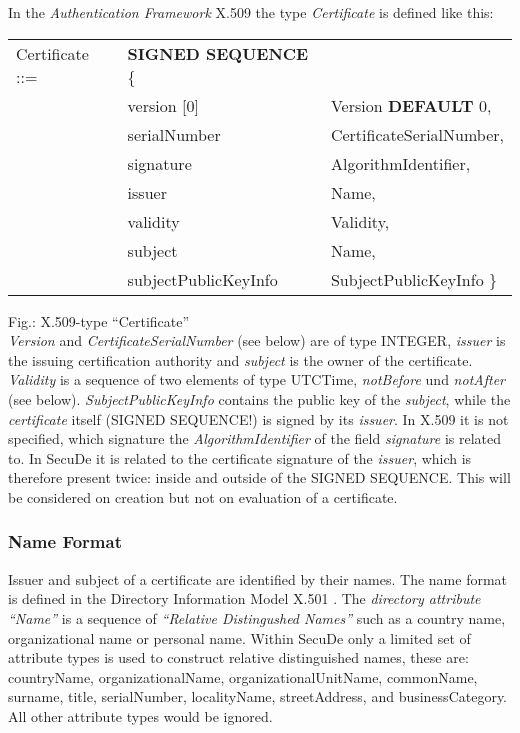 In the {\em Authentication Framework} X.509 \cite{cci4} the type
{\em Certificate} is defined like this:

\begin {center}
\begin {tabular}{lll}
Certificate ::= & {\bf SIGNED SEQUENCE} \{ & \\
  & version [0]   & Version {\bf DEFAULT} 0, \\
  & serialNumber  & CertificateSerialNumber, \\
  & signature     & AlgorithmIdentifier,     \\
  & issuer        & Name,                    \\
  & validity      & Validity,                \\
  & subject       & Name,                    \\
  & subjectPublicKeyInfo & SubjectPublicKeyInfo \} \\
\end {tabular}
\end {center}
\label{fig-sc-cfv}
{\footnotesize Fig.: X.509-type ``Certificate''}
\\[1ex]
{\em Version} and {\em CertificateSerialNumber} (see below)
are of type INTEGER,
{\em issuer} is the issuing certification authority
and {\em subject} is the owner of the certificate.
{\em Validity} is a sequence of two elements of type UTCTime,
{\em not\-Be\-fore} und {\em not\-Af\-ter} (see below).
{\em SubjectPublicKeyInfo} contains
the public key of the {\em subject}, while
the {\em certificate} itself (SIGNED SEQUENCE!)
is signed by its  {\em issuer}.
In X.509 it is not specified, which signature the
{\em AlgorithmIdentifier} of the field {\em signature} is related to.
In SecuDe
it is related to the certificate signature of the {\em issuer},
which is therefore present twice: inside and outside of the
SIGNED SEQUENCE.
This will be considered on creation but not on evaluation of a certificate.

\subsubsection{Name Format}
\label{sc-nf}
 
Issuer and subject of a certificate are identified by their names.
The name format is defined in the Directory Information Model
X.501 \cite{cci3}.
The {\em directory attribute ``Name''}
is a sequence of {\em ``Relative Distingushed Names''}
such as a country name, organizational name or personal name.
Within SecuDe
only a limited set of attribute types is used to construct relative distinguished names,
these are:
countryName, organizationalName, organizationalUnitName, commonName, surname,
title, serialNumber, localityName, streetAddress, and businessCategory.
All other attribute types would be ignored.

